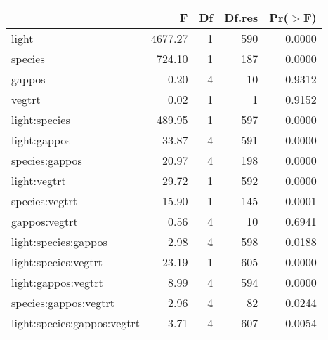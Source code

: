 \begin{tabular}{lrrrr}
  \hline
 & F & Df & Df.res & Pr($>$F) \\ 
  \hline
light & 4677.27 & 1 & 590 & 0.0000 \\ 
  species & 724.10 & 1 & 187 & 0.0000 \\ 
  gappos & 0.20 & 4 & 10 & 0.9312 \\ 
  vegtrt & 0.02 & 1 & 1 & 0.9152 \\ 
  light:species & 489.95 & 1 & 597 & 0.0000 \\ 
  light:gappos & 33.87 & 4 & 591 & 0.0000 \\ 
  species:gappos & 20.97 & 4 & 198 & 0.0000 \\ 
  light:vegtrt & 29.72 & 1 & 592 & 0.0000 \\ 
  species:vegtrt & 15.90 & 1 & 145 & 0.0001 \\ 
  gappos:vegtrt & 0.56 & 4 & 10 & 0.6941 \\ 
  light:species:gappos & 2.98 & 4 & 598 & 0.0188 \\ 
  light:species:vegtrt & 23.19 & 1 & 605 & 0.0000 \\ 
  light:gappos:vegtrt & 8.99 & 4 & 594 & 0.0000 \\ 
  species:gappos:vegtrt & 2.96 & 4 & 82 & 0.0244 \\ 
  light:species:gappos:vegtrt & 3.71 & 4 & 607 & 0.0054 \\ 
   \hline
\end{tabular}
